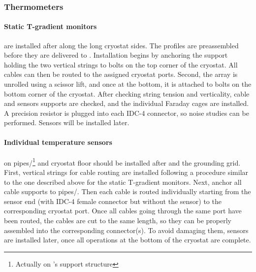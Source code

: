 \subsubsection{Thermometers}
\label{sec:fdgen-slow-cryo-install-th}

\paragraph{Static T-gradient monitors}
are installed after  along the long cryostat sides. The profiles %
are preassembled before they are delivered to \surf. 
Installation begins by anchoring the support holding the two vertical strings to bolts on the top corner of the cryostat. All cables can then be routed to the assigned cryostat ports. Second, the array is unrolled using a scissor lift, and once at the bottom, it is attached to bolts on the bottom corner of the cryostat. After checking string tension and verticality, cable and sensors supports are checked, and the individual Faraday cages are installed. A precision resistor is plugged into each IDC-4 connector, so noise studies can be performed. Sensors will be installed later. 

\paragraph{Individual temperature sensors} on pipes/\footnote{Actually on 's support structure}  and cryostat floor %
should be installed after  and the grounding grid. First, vertical strings for cable routing %
are installed following a procedure similar to the one described above for the static T-gradient monitors. Next, anchor all cable supports to pipes/. Then each cable %
is routed individually starting from the sensor end (with IDC-4 female connector but without the sensor)
to the corresponding cryostat port. Once all cables going through the same port have been routed, the cables are cut to the same length, so they can be properly assembled into the corresponding connector(s). To avoid damaging them, sensors are installed later, once all operations at the bottom of the cryostat are complete. 

 


